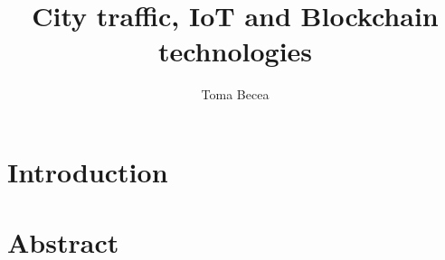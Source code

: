 \documentclass[a4paper,12pt,twoside]{book}
\title{ City traffic, IoT and Blockchain technologies }
\author{Toma Becea}
\begin{document}
\maketitle

\clearpage

\section{Introduction}

\section{Abstract}

\section{}
\label{sec:microservicesbasedapproachtrafficsim}

\section{}
\label{sec:citytrafficoptimizations}


\end{document}
